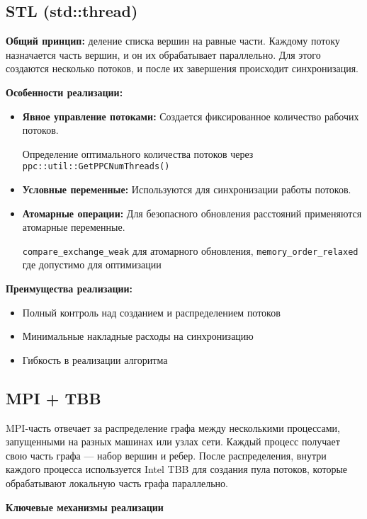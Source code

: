 \documentclass[12pt]{article}
\begin{document}
\subsection{STL (std::thread) }
\textbf{Общий принцип:} деление списка вершин на равные части. Каждому потоку назначается часть вершин, и он их обрабатывает параллельно. Для этого создаются несколько потоков, и после их завершения происходит синхронизация.

\textbf{Особенности реализации:}
\begin{itemize}
\item \textbf{Явное управление потоками:} Создается фиксированное количество рабочих потоков.

Определение оптимального количества потоков через \texttt{ppc::util::GetPPCNumThreads()}
\item \textbf{Условные переменные:} Используются для синхронизации работы потоков.
\item \textbf{Атомарные операции:} Для безопасного обновления расстояний применяются атомарные переменные.

\texttt{compare\_exchange\_weak} для атомарного обновления, \texttt{memory\_order\_relaxed } где допустимо для оптимизации
\end{itemize}

\textbf{Преимущества реализации:}
\begin{itemize}
\item Полный контроль над созданием и распределением потоков
\item Минимальные накладные расходы на синхронизацию
\item Гибкость в реализации алгоритма
\end{itemize}


\subsection{MPI + TBB}

\hspace*{1.25em}MPI-часть отвечает за распределение графа между несколькими процессами, запущенными на разных машинах или узлах сети. Каждый процесс получает свою часть графа — набор вершин и ребер.
После распределения, внутри каждого процесса используется Intel TBB для создания пула потоков, которые обрабатывают локальную часть графа параллельно. 

\textbf{Ключевые механизмы реализации}
\end{document}
